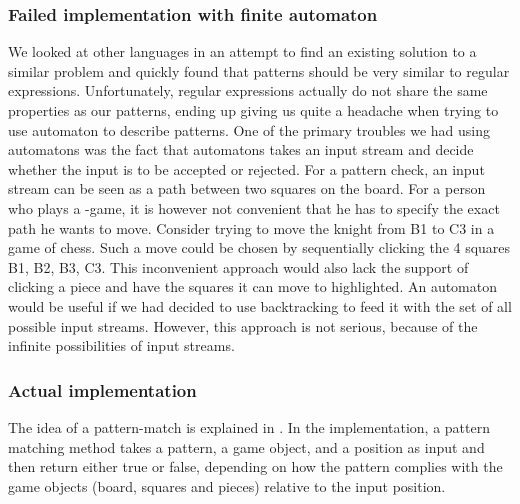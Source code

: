 \subsubsection{Failed implementation with finite automaton}
We looked at other languages in an attempt to find an existing solution
to a similar problem and quickly found that patterns should be very
similar to regular expressions. Unfortunately, regular expressions
actually do not share the same properties as our patterns, ending up
giving us quite a headache when trying to use automaton to describe
patterns. One of the primary troubles we had using automatons was the fact 
that automatons takes an input stream and decide whether the input is to be accepted 
or rejected. For a pattern check, an input stream can be seen as a path 
between two squares on the board. For a person who plays a \productname{}-game, it is however 
not convenient that he has to specify the exact path he wants to move. Consider trying to move the 
knight from B1 to C3 in a game of chess. Such a move could be chosen by 
sequentially clicking the 4 squares  B1, B2, B3, C3. This inconvenient approach 
would also lack the support of clicking a piece and have the squares it can 
move to highlighted. An automaton would be useful if we had decided to use backtracking 
to feed it with the set of all possible input streams. However, this approach is 
not serious, because of the infinite possibilities of input streams. 

\subsubsection{Actual implementation}
The idea of a pattern-match is explained in . In the implementation, a pattern matching method takes a pattern, a game object, and a position as input and then return either true or false, depending on how the pattern complies with the game objects (board, squares and pieces) relative to the input position.


